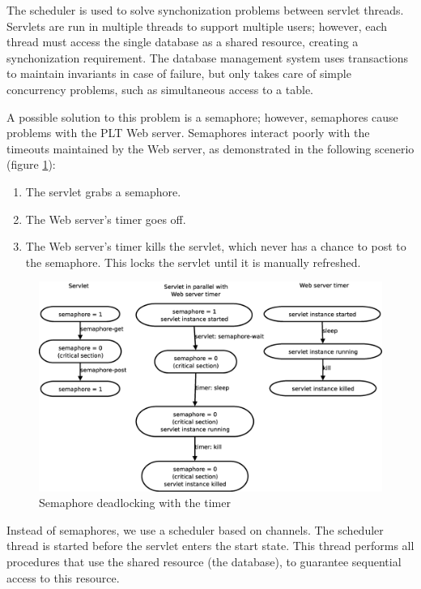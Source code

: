 \documentclass[a4paper]{article}
\begin{document}
The scheduler is used to solve synchonization problems between servlet threads.
Servlets are run in multiple threads to support multiple users; however, each
thread must access the single database as a shared resource, creating a
synchonization requirement. The database management system uses transactions to
maintain invariants in case of failure, but only takes care of simple
concurrency problems, such as simultaneous access to a table.

A possible solution to this problem is a semaphore; however, semaphores cause
problems with the PLT Web server. Semaphores interact poorly with the timeouts
maintained by the Web server, as demonstrated in the following scenerio (figure
\ref{fig:semaphores}):

\begin{enumerate}
\item{The servlet grabs a semaphore.}
\item{The Web server's timer goes off.}
\item{The Web server's timer kills the servlet, which never has a chance to
post to the semaphore. This locks the servlet until it is manually refreshed.}
\end{enumerate}



\begin{figure}[ht]
\centering
\includegraphics[scale=.30]{semaphore-deadlock.eps}
\caption{Semaphore deadlocking with the timer}
\label{fig:semaphores}
\end{figure}

Instead of semaphores, we use a scheduler based on channels. The scheduler
thread is started before the servlet enters the start state. This thread
performs all procedures that use the shared resource (the database), to
guarantee sequential access to this resource.
\end{document}
